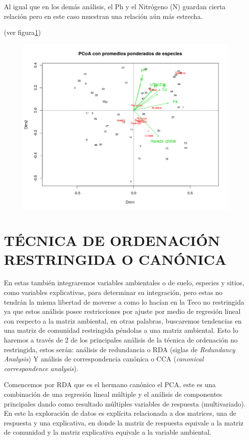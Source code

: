 \documentclass[11pt,]{article}
\begin{document}
Al igual que en los demás análisis, el Ph y el Nitrógeno (N) guardan
cierta relación pero en este caso muestran una relación aún más
estrecha.

(ver figura\ref{fig:PCoA})

\begin{figure}
\centering
\includegraphics{PCoA.png}
\caption{\label{fig:PCoA}}
\end{figure}

\section{TÉCNICA DE ORDENACIÓN RESTRINGIDA O
CANÓNICA}\label{tuxe9cnica-de-ordenaciuxf3n-restringida-o-canuxf3nica}

En estas también integraremos variables ambientales o de suelo, especies
y sitios, como variables explicativas, para determinar su integración,
pero estas no tendrán la misma libertad de moverse a como lo hacían en
la Teco no restringida ya que estos análisis posee restricciones por
ajuste por medio de regresión lineal con respecto a la matriz ambiental,
en otras palabras, buscaremos tendencias en una matriz de comunidad
restringida péndolas a una matriz ambiental. Esto lo haremos a través de
2 de los principales análisis de la técnica de ordenación no
restringida, estos serán: análisis de redundancia o RDA (siglas de
\emph{Redundancy Analysis}) Y análisis de correspondencia canónica o CCA
(\emph{canonical correspondence analysis}).

Comencemos por RDA que es el hermano canónico el PCA, este es una
combinación de una regresión lineal múltiple y el análisis de
componentes principales dando como resultado múltiples variables de
respuesta (multivariado). En este la exploración de datos es explícita
relacionada a dos matrices, una de respuesta y una explicativa, en donde
la matriz de respuesta equivale a la matriz de comunidad y la matriz
explicativa equivale a la variable ambiental.
\end{document}
